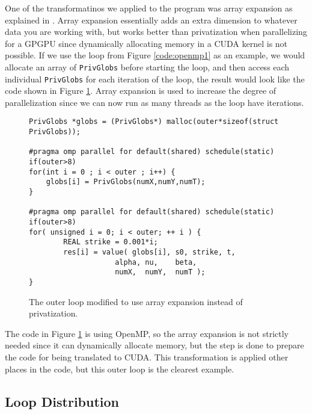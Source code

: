 One of the transformatinos we applied to the program was array expansion as
explained in \cite[Slide 11]{projectslide}. Array expansion essentially adds an
extra dimension to whatever data you are working with, but works better than
privatization when parallelizing for a GPGPU since dynamically allocating memory
in a CUDA kernel is not possible. If we use the loop from Figure
\ref{code:openmp1} as an example, we would allocate an array of
\texttt{PrivGlobs} before starting the loop, and then access each individual
\texttt{PrivGlobs} for each iteration of the loop, the result would look like
the code shown in Figure \ref{code:arrayexp1}. Array expansion is used to
increase the degree of parallelization since we can now run as many threads as
the loop have iterations.

\begin{figure}[H]
    \begin{lstlisting}
PrivGlobs *globs = (PrivGlobs*) malloc(outer*sizeof(struct PrivGlobs));

#pragma omp parallel for default(shared) schedule(static) if(outer>8)
for(int i = 0 ; i < outer ; i++) {
    globs[i] = PrivGlobs(numX,numY,numT);
}

#pragma omp parallel for default(shared) schedule(static) if(outer>8)
for( unsigned i = 0; i < outer; ++ i ) {
        REAL strike = 0.001*i;
        res[i] = value( globs[i], s0, strike, t,
                    alpha, nu,    beta,
                    numX,  numY,  numT );
}
    \end{lstlisting}
    \caption{The outer loop modified to use array expansion instead of
    privatization.}
    \label{code:arrayexp1}
\end{figure}

The code in Figure \ref{code:arrayexp1} is using OpenMP, so the array expansion
is not strictly needed since it can dynamically allocate memory, but the step is
done to prepare the code for being translated to CUDA. This transformation is
applied other places in the code, but this outer loop is the clearest example.

\subsection{Loop Distribution}